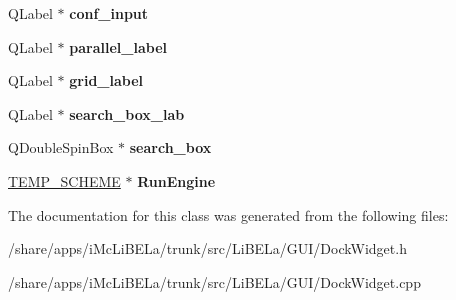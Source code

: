 \begin{DoxyCompactItemize}
\item 
\hypertarget{classDockWidget_a0ac993107a8e1de74d6f93badda072ae}{
QLabel $\ast$ {\bfseries conf\_\-input}}
\label{classDockWidget_a0ac993107a8e1de74d6f93badda072ae}

\item 
\hypertarget{classDockWidget_ab8f7b11d6ea46e81e08d4caf473d8cd9}{
QLabel $\ast$ {\bfseries parallel\_\-label}}
\label{classDockWidget_ab8f7b11d6ea46e81e08d4caf473d8cd9}

\item 
\hypertarget{classDockWidget_ae6d5be44d9976c9d151bc179c0d450b0}{
QLabel $\ast$ {\bfseries grid\_\-label}}
\label{classDockWidget_ae6d5be44d9976c9d151bc179c0d450b0}

\item 
\hypertarget{classDockWidget_ac94a41d2cc8f044a2a6d68c1e887123c}{
QLabel $\ast$ {\bfseries search\_\-box\_\-lab}}
\label{classDockWidget_ac94a41d2cc8f044a2a6d68c1e887123c}

\item 
\hypertarget{classDockWidget_ae637c98893cc604675bf584aac718da0}{
QDoubleSpinBox $\ast$ {\bfseries search\_\-box}}
\label{classDockWidget_ae637c98893cc604675bf584aac718da0}

\item 
\hypertarget{classDockWidget_a0119a6ec8f27a29c23b0f02e826bd15d}{
\hyperlink{classTEMP__SCHEME}{TEMP\_\-SCHEME} $\ast$ {\bfseries RunEngine}}
\label{classDockWidget_a0119a6ec8f27a29c23b0f02e826bd15d}

\end{DoxyCompactItemize}


The documentation for this class was generated from the following files:\begin{DoxyCompactItemize}
\item 
/share/apps/iMcLiBELa/trunk/src/LiBELa/GUI/DockWidget.h\item 
/share/apps/iMcLiBELa/trunk/src/LiBELa/GUI/DockWidget.cpp\end{DoxyCompactItemize}
